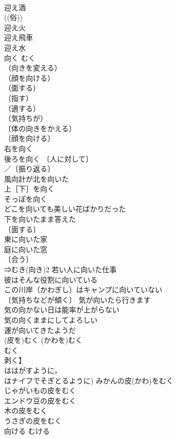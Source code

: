 \documentclass[8pt]{extreport}
\begin{document}
\begin{CJK}{UTF8}{min}
\\	迎え酒 
\\	((俗)) 
\\	迎え火 
\\	迎え飛車 
\\	迎え水 
\\	向く	むく	
\\	（向きを変える）
\\	（顔を向ける）
\\	（面する）
\\	（指す）
\\	（適する）
\\	（気持ちが）
\\	〔体の向きをかえる〕
\\	〔顔を向ける〕
\\	右を向く 
\\	後ろを向く 〔人に対して〕
\\	／〔振り返る〕
\\	風向計が北を向いた 
\\	上［下］を向く 
\\	そっぽを向く 
\\	どこを向いても美しい花ばかりだった 
\\	下を向いたまま答えた 
\\	〔面する〕
\\	東に向いた家 
\\	庭に向いた窓 
\\	〔合う〕
\\	⇒むき(向き)2 若い人に向いた仕事 
\\	彼はそんな役割に向いている 
\\	この川岸（かわぎし）はキャンプに向いていない 
\\	〔気持ちなどが傾く〕 気が向いたら行きます 
\\	気の向かない日は能率が上がらない 
\\	気の向くままにしてよろしい 
\\	運が向いてきたようだ 
\\	(皮を)むく	(かわを)むく	
\\	むく
\\	剥く】 
\\	ははがすように，
\\	はナイフでそぎとるように) みかんの皮(かわ)をむく 
\\	じゃがいもの皮をむく 
\\	エンドウ豆の皮をむく 
\\	木の皮をむく 
\\	うさぎの皮をむく 
\\	向ける	むける	

\end{CJK}
\end{document}
